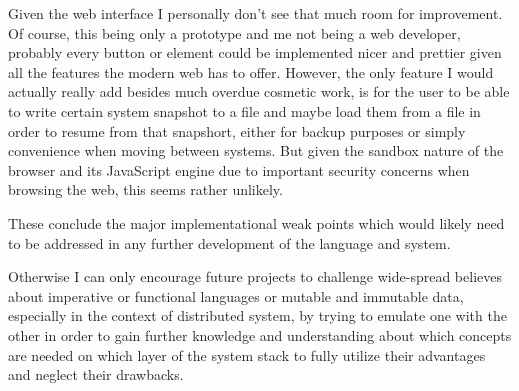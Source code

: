 Given the web interface I personally don't see that much room
for improvement. Of course, this being only a prototype and me
not being a web developer, probably every button or element
could be implemented nicer and prettier given all the features
the modern web has to offer. However, the only feature I would
actually really add besides much overdue cosmetic work, is for
the user to be able to write certain system snapshot to a file
and maybe load them from a file in order to resume from that
snapshort, either for backup purposes or simply convenience
when moving between systems. But given the sandbox nature of
the browser and its JavaScript engine due to important security
concerns when browsing the web, this seems rather unlikely.
\newline

These conclude the major implementational weak points which
would likely need to be addressed in any further development
of the language and system.

Otherwise I can only encourage future projects to challenge
wide-spread believes about imperative or functional languages
or mutable and immutable data, especially in the
context of distributed system, by trying to emulate one with
the other in order to gain further knowledge and understanding
about which concepts are needed on which layer of the system
stack to fully utilize their advantages and neglect their drawbacks.


